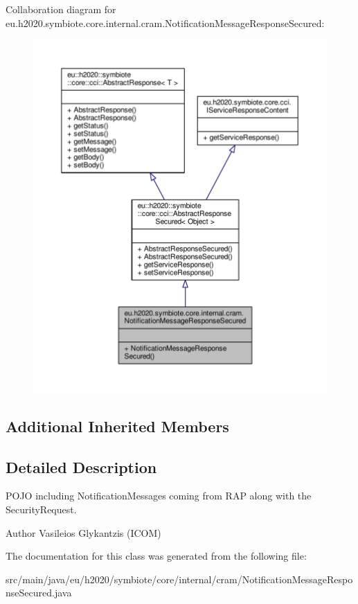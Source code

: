 Collaboration diagram for eu.\+h2020.\+symbiote.\+core.\+internal.\+cram.\+Notification\+Message\+Response\+Secured\+:\nopagebreak
\begin{figure}[H]
\begin{center}
\leavevmode
\includegraphics[width=350pt]{classeu_1_1h2020_1_1symbiote_1_1core_1_1internal_1_1cram_1_1NotificationMessageResponseSecured__coll__graph}
\end{center}
\end{figure}
\subsection*{Additional Inherited Members}


\subsection{Detailed Description}
P\+O\+JO including Notification\+Messages coming from R\+AP along with the Security\+Request. \begin{DoxyAuthor}{Author}
Vasileios Glykantzis (I\+C\+OM) 
\end{DoxyAuthor}


The documentation for this class was generated from the following file\+:\begin{DoxyCompactItemize}
\item 
src/main/java/eu/h2020/symbiote/core/internal/cram/Notification\+Message\+Response\+Secured.\+java\end{DoxyCompactItemize}
